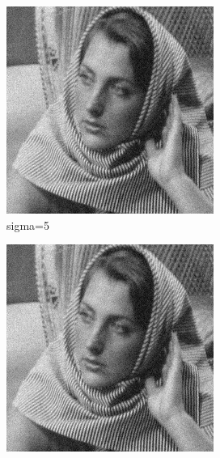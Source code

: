 \documentclass[12pt]{article}
\begin{document}
\begin{figure}[h]
    \centering
    \begin{subfigure}[b]{0.24\textwidth}
        \centering
        \includegraphics[width=\textwidth]{../images/noisy_barbara_10.png}
        \caption{sigma=5}
        \label{Noisy (sigma=10)}
    \end{subfigure}
    \begin{subfigure}[b]{0.24\textwidth}
        \centering
        \includegraphics[width=\textwidth]{../images/filtered_barbara_10_sigma_s_2_sigma_r_2.png}

\end{subfigure}
\end{figure}
\end{document}
